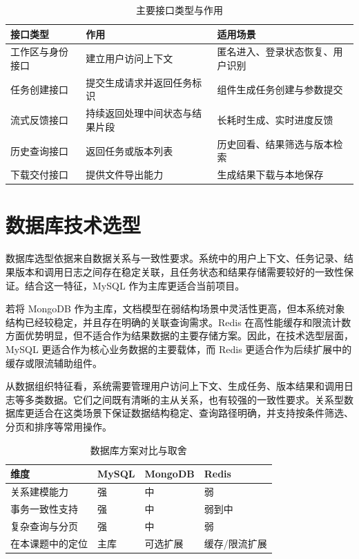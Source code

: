 \begin{table}[htbp]
\centering
\caption{主要接口类型与作用}
\label{tab:chapter2-api-map}
\small
\begin{tabular}{@{}p{}p{}p{}@{}}
\toprule
接口类型 & 作用 & 适用场景 \\
\midrule
工作区与身份接口 & 建立用户访问上下文 & 匿名进入、登录状态恢复、用户识别 \\
任务创建接口 & 提交生成请求并返回任务标识 & 组件生成任务创建与参数提交 \\
流式反馈接口 & 持续返回处理中间状态与结果片段 & 长耗时生成、实时进度反馈 \\
历史查询接口 & 返回任务或版本列表 & 历史回看、结果筛选与版本检索 \\
下载交付接口 & 提供文件导出能力 & 生成结果下载与本地保存 \\
\bottomrule
\end{tabular}
\end{table}

\section{数据库技术选型}
数据库选型依据来自数据关系与一致性要求。系统中的用户上下文、任务记录、结果版本和调用日志之间存在稳定关联，且任务状态和结果存储需要较好的一致性保证。结合这一特征，MySQL 作为主库更适合当前项目。

若将 MongoDB 作为主库，文档模型在弱结构场景中灵活性更高，但本系统对象结构已经较稳定，并且存在明确的关联查询需求。Redis 在高性能缓存和限流计数方面优势明显，但不适合作为结果数据的主要存储方案。因此，在技术选型层面，MySQL 更适合作为核心业务数据的主要载体，而 Redis 更适合作为后续扩展中的缓存或限流辅助组件。

从数据组织特征看，系统需要管理用户访问上下文、生成任务、版本结果和调用日志等多类数据。它们之间既有清晰的主从关系，也有较强的一致性要求。关系型数据库更适合在这类场景下保证数据结构稳定、查询路径明确，并支持按条件筛选、分页和排序等常用操作。

\begin{table}[htbp]
\centering
\caption{数据库方案对比与取舍}
\label{tab:chapter2-db-compare}
\small
\begin{tabular}{@{}p{}p{}p{}p{}@{}}
\toprule
维度 & MySQL & MongoDB & Redis \\
\midrule
关系建模能力 & 强 & 中 & 弱 \\
事务一致性支持 & 强 & 中 & 弱到中 \\
复杂查询与分页 & 强 & 中 & 弱 \\
在本课题中的定位 & 主库 & 可选扩展 & 缓存/限流扩展 \\
\bottomrule
\end{tabular}
\end{table}

